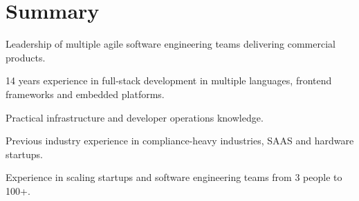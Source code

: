 \documentclass[]{tjd-cv}
\begin{document}
%
%
\lastupdated

%
%

\begin{minipage}[t]{1\textwidth}
\section{Summary}
\vspace{\topsep}
\normalfont
\normalsize
\begin{tightemize}
\item Leadership of multiple agile software engineering teams delivering commercial products.
\item 14 years experience in full-stack development in multiple languages, frontend frameworks and embedded platforms.
\item Practical infrastructure and developer operations knowledge.
\item Previous industry experience in compliance-heavy industries, SAAS and hardware startups.
\item Experience in scaling startups and software engineering teams from 3 people to 100+.
\end{tightemize}
\end{minipage}

\hspace{0pt}

%
%
\end{document}
